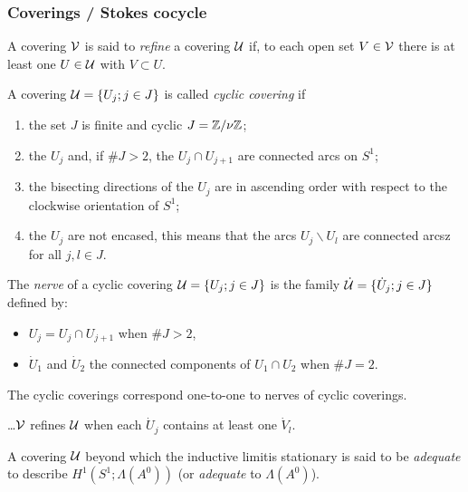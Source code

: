 \subsubsection{Coverings / Stokes cocycle}
\begin{comment}
  \cite{Loday1994} \$II.1
\end{comment}
A covering $\mathcal{V}$ is said to \emph{refine} a covering $\mathcal{U}$ if, to each open set
$V\in\mathcal{V}$ there is at least one $U\in\mathcal{U}$ with $V\subset U$.
\begin{defn}
  A covering $\mathcal{U}=\{U_j;j\in J\}$ is called \emph{cyclic covering} if
  \begin{enumerate}
    \item the set $J$ is finite and cyclic $J=\mathbb{Z}/\nu\mathbb{Z}$;
    \item the $U_j$ and, if $\#J>2$, the $U_j\cap U_{j+1}$ are connected arcs on
      $S^1$;
    \item the bisecting directions of the $U_j$ are in ascending order with
      respect to the clockwise orientation of $S^1$;
    \item the $U_j$ are not encased, this means that the arcs
      $U_j\backslash U_l$ are connected arcsz for all $j,l\in J$.
  \end{enumerate}
\end{defn}
\begin{defn}
  The \emph{nerve} of a cyclic covering $\mathcal{U}=\{U_j;j\in J\}$ is the family
  $\dot{\mathcal{U}}=\{\dot U_j;j\in J\}$ defined by:
  \begin{itemize}
    \item $U_j=U_j\cap U_{j+1}$ when $\#J>2$,
    \item $\dot U_1$ and $\dot U_2$ the connected components of $U_1\cap U_2$
      when $\#J=2$.
  \end{itemize}
\end{defn}
The cyclic coverings correspond one-to-one to nerves of cyclic coverings.
\begin{prop}
  \dots $\mathcal{V}$ refines $\mathcal{U}$ when each $\dot U_j$ contains at least one
  $\dot V_l$.
\end{prop}

\begin{defn}
  A covering $\mathcal{U}$ beyond which the inductive limit\TODO[which] is stationary
  is said to be \emph{adequate} to describe $H^1(S^1;\Lambda(A^0))$ (or
  \emph{adequate} to $\Lambda(A^0)$).
\end{defn}

\TODO[\dots]

